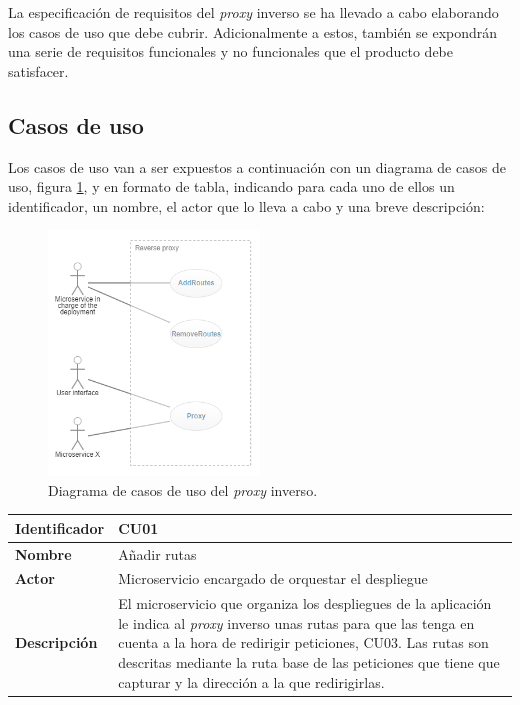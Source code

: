 \documentclass[11pt,spanish,listoffigures]{tfgetsinf}
\begin{document}
La especificación de requisitos del \emph{proxy} inverso se ha llevado a cabo elaborando los casos de uso que debe cubrir. Adicionalmente a estos, también se expondrán una serie de requisitos funcionales y no funcionales que el producto debe satisfacer.


		\subsection{Casos de uso}

Los casos de uso van a ser expuestos a continuación con un diagrama de casos de uso, figura \ref{diagramaCasosDeUso}, y en formato de tabla, indicando para cada uno de ellos un identificador, un nombre, el actor que lo lleva a cabo y una breve descripción:

\begin{figure}[ht]
\centering
\includegraphics[width=0.5\textwidth]{imagenes/diagramaCasosDeUso}
\caption{Diagrama de casos de uso del \emph{proxy} inverso.}
	\label{diagramaCasosDeUso}
\end{figure}

\begin{center} \begin{tabular}{| l | p{11.3cm} |}
\hline
\textbf{Identificador} & CU01
\\ \hline
\textbf{Nombre} & Añadir rutas
\\ \hline
\textbf{Actor} & Microservicio encargado de orquestar el despliegue
\\ \hline
\textbf{Descripción} & El microservicio que organiza los despliegues de la aplicación le indica al \emph{proxy} inverso unas rutas para que las tenga en cuenta a la hora de redirigir peticiones, CU03. Las rutas son descritas mediante la ruta base de las peticiones que tiene que capturar y la dirección a la que redirigirlas.
\\ \hline \end{tabular} \end{center}
\end{document}
